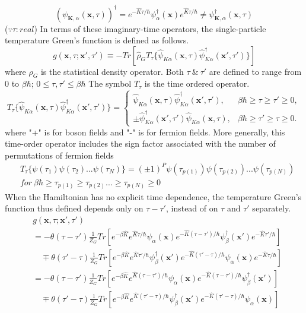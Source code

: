 $$(\psi_{\mathbf{K},\alpha}(\mathbf{x},\tau))^{\dagger}=e^{-\hat{K}\tau/\hbar}\psi_{\alpha}^{\dagger}(\mathbf{x})e^{\hat{K}\tau/\hbar}
\not=\psi^{\dagger}_{\mathbf{K},\alpha}(\mathbf{x},\tau)$$
($\because \tau : real$)
In terms of these imaginary-time operators, the single-particle temperature Green's function is defined as follows.
\begin{equation}
g(\mathbf{x},\tau;\mathbf{x'},\tau')\equiv-Tr[\hat{\rho}_{G}T_{\tau}\{\hat{\psi}_{K\alpha}(\mathbf{x},\tau)\hat{\psi}_{K\alpha}^{\dagger}(\mathbf{x'},\tau')\}]
\end{equation}
where $\rho_{G}$ is the statistical density operator.
Both $\tau\ \&\ \tau'$ are defined to range from $0$ to $\beta\hbar$; $0\leq\tau,\tau'\leq\beta\hbar$
The symbol $T_{\tau}$ is the time ordered operator.
$$
{T_{\tau}\{\hat{\psi}_{K\alpha}(\mathbf{x},\tau)\hat{\psi}_{K\alpha}^{\dagger}(\mathbf{x'},\tau')\}=}
\begin{cases}
\hat{\psi}_{K\alpha}(\mathbf{x},\tau)\hat{\psi}_{K\alpha}^{\dagger}(\mathbf{x'},\tau') , &\beta\hbar\geq\tau\geq\tau'\geq 0, \\
\pm\hat{\psi}_{K\alpha}^{\dagger}(\mathbf{x'},\tau')\hat{\psi}_{K\alpha}(\mathbf{x},\tau) , &\beta\hbar\geq\tau'\geq\tau\geq 0.
\end{cases}
$$
where "+" is for boson fields and "-" is for fermion fields.
More generally, this time-order operator includes the sign factor associated with the number of permutations of fermion fields
$$
\begin{aligned}
&T_{\tau}\{\psi(\tau_{1})\psi(\tau_{2})...\psi(\tau_{N})\}=(\pm1)^{P}\psi(\tau_{p(1)})\psi(\tau_{p(2)})...\psi(\tau_{p(N)})\\
&for\ \beta\hbar\ge\tau_{p(1)}\ge\tau_{p(2)}...\ge\tau_{p(N)}\ge0
\end{aligned}
$$
When the Hamiltonian has no explicit time dependence, the temperature Green's function thus defined depends only on $\tau-\tau'$, instead of on $\tau$ and $\tau'$ separately.
\begin{equation}
\begin{aligned}
&g(\mathbf{x},\tau;\mathbf{x'},\tau')\\
&=-\theta(\tau-\tau')\frac{1}{Z_{G}}Tr[e^{-\beta\hat{K}}e^{\hat{K}\tau/\hbar}\psi_{\alpha}(\mathbf{x})
e^{-\hat{K}(\tau-\tau')/\hbar}\psi_{\beta}^{\dagger}(\mathbf{x'})e^{-\hat{K}\tau'/\hbar}]\\
&\quad\mp\theta(\tau'-\tau)\frac{1}{Z_{G}}Tr[e^{-\beta\hat{K}}e^{\hat{K}\tau'/\hbar}\psi_{\beta}^{\dagger}(\mathbf{x'})
e^{-\hat{K}(\tau'-\tau)/\hbar}\psi_{\alpha}(\mathbf{x})e^{-\hat{K}\tau/\hbar}]\\
&=-\theta(\tau-\tau') \frac{1}{Z_{G}} Tr[e^{-\beta\hat{K}} e^{\hat{K}(\tau-\tau')/\hbar}\psi_{\alpha}(\mathbf{x})
e^{-\hat{K}(\tau-\tau')/\hbar}\psi_{\beta}^{\dagger}(\mathbf{x'})]\\
&\quad\mp\theta(\tau'-\tau)\frac{1}{Z_{G}}Tr[e^{-\beta\hat{K}}e^{\hat{K}(\tau'-\tau)/\hbar}\psi_{\beta}^{\dagger}(\mathbf{x'})
e^{-\hat{K}(\tau'-\tau)/\hbar}\psi_{\alpha}(\mathbf{x})]
\end{aligned}
\end{equation}
